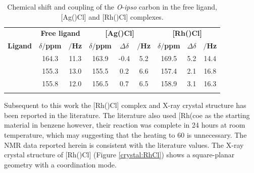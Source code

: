 \begin{table}[htbp]
\caption[\carbon{} Chemical shift and coupling of the \emph{O}-\emph{ipso} carbon when in the free ligand, [Ag(\tBuxantphos)Cl{]} and [Rh(\tBuxantphos)Cl{]} complexes]{\carbon{} Chemical shift and coupling of the \emph{O}-\emph{ipso} carbon in the free ligand, [Ag(\tBuxantphos)Cl] and [Rh(\tBuxantphos)Cl] complexes.}
\vspace{1em}
\label{table:oxygenbindingrh}
\small
\begin{center}
\begin{tabular}{ c c c c c c c c c}
	\toprule{}
	~&\multicolumn{2}{c}{\bfseries{Free ligand}} &\multicolumn{3}{c}{\bfseries{[Ag(\tBuxantphos)Cl]}}&\multicolumn{3}{c}{\bfseries{[Rh(\tBuxantphos)Cl]}}\\
	\cmidrule(lr){2-3} \cmidrule(lr){4-6} \cmidrule(lr){7-9}
	\bfseries{Ligand}&\bfseries{$\delta/$ppm}&\bfseries{\J{}$/$Hz}&\bfseries{$\delta/$ppm}&\bfseries{$\Delta\delta$}&\bfseries{\J{}$/$Hz}&\bfseries{$\delta/$ppm}&\bfseries{$\Delta\delta$}&\bfseries{\J{}$/$Hz}\\
	\midrule{}
	\tBuSixantphos	&	164.3	& 11.3	&	163.9	& -0.4	& 5.2		& 169.5	& 5.2 	& 14.4 \\
	\tBuThixantphos&	155.3	& 13.0	&	155.5	& 0.2 	& 6.6 	& 157.4	& 2.1 	&16.8 \\
	\tBuXantphos	&	155.8	& 12.0	&	156.5	& 0.7		& 6.5		& 158.9	& 3.1		& 16.3 \\
	\bottomrule{}
\end{tabular}
\end{center}
\end{table}

Subsequent to this work the [Rh(\tBuxantphosk)Cl] complex and X-ray crystal structure has been reported in the literature.\cite{Haibach2013}  The literature also used [Rh(\acrshort{coe}\ce{)2Cl]2} as the starting material in benzene however, their reaction was complete in 24 hours at room temperature, which may suggesting that the heating to 60 \degC{} is unnecessary.  The NMR data reported herein is consistent with the literature values.  The X-ray crystal structure of [Rh(\tBuxantphosk)Cl] (Figure \ref{crystal:RhCl}) shows a square-planar geometry with a \tBuxantphosk{} coordination mode.  


